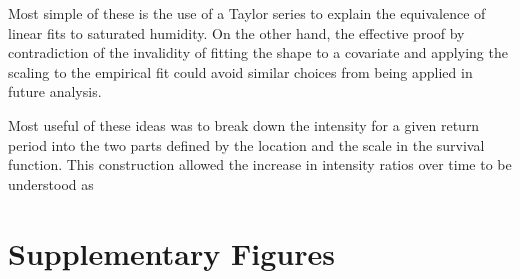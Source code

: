 \documentclass[12pt,a4paper,openany]{report}
\begin{document}
Most simple of these is the use of a Taylor series to explain
    the equivalence of linear fits to saturated humidity.
On the other hand,
    the effective proof by contradiction of the invalidity of fitting the shape to a covariate and applying the
    scaling to the empirical fit could avoid similar choices from being applied in future analysis.

Most useful of these ideas was to break down the intensity for a given return period
    into the two parts defined by the location and the scale in the survival function.
This construction allowed the increase in intensity ratios over time to be understood as

\appendix


\chapter{Supplementary Figures}\label{ch:supp}
\end{document}
